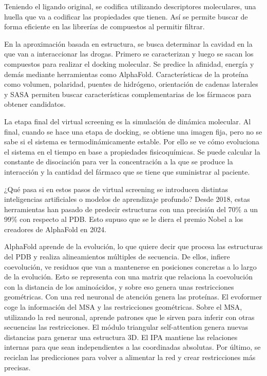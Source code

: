 Teniendo el ligando original, se codifica utilizando descriptores moleculares, una huella que va a codificar las propiedades que tienen. Así se permite buscar de forma eficiente en las librerías de compuestos al permitir filtrar. 

En la aproximación basada en estructura, se busca determinar la cavidad en la que van a interaccionar las drogas. Primero se caracterizan y luego se sacan los compuestos para realizar el docking molecular. Se predice la afinidad, energía y demás mediante herramientas como AlphaFold. Características de la proteína como volumen, polaridad, puentes de hidrógeno, orientación de cadenas laterales y SASA permiten buscar características complementarias de los fármacos para obtener candidatos. 

La etapa final del virtual screening es la simulación de dinámica molecular. Al final, cuando se hace una etapa de docking, se obtiene una imagen fija, pero no se sabe si el sistema es termodinámicamente estable. Por ello se ve cómo evoluciona el sistema en el tiempo en base a propiedades fisicoquímicas. Se puede calcular la constante de disociación para ver la concentración a la que se produce la interacción y la cantidad del fármaco que se tiene que suministrar al paciente. 

¿Qué pasa si en estos pasos de virtual screening se introducen distintas inteligencias artificiales o modelos de aprendizaje profundo? Desde 2018, estas herramientas han pasado de predecir estructuras con una precisión del 70\% a un 99\% con respecto al PDB. Esto supuso que se le diera el premio Nobel a los creadores de AlphaFold en 2024. 

AlphaFold aprende de la evolución, lo que quiere decir que procesa las estructuras del PDB y realiza alineamientos múltiples de secuencia. De ellos, infiere coevolución, ve residuos que van a mantenerse en posiciones concretas a lo largo de la evolución. Esto se representa con una matriz que relaciona la coevolución con la distancia de los aminoácidos, y sobre eso genera unas restricciones geométricas. Con una red neuronal de atención genera las proteínas. El evoformer coge la información del MSA y las restricciones geométricas. Sobre el MSA, utilizando la red neuronal, aprende patrones que le sirven para inferir con otras secuencias las restricciones. El módulo triangular self-attention genera nuevas distancias para generar una estructura 3D. El IPA mantiene las relaciones internas para que sean independientes a las coordinadas absolutas. Por último, se reciclan las predicciones para volver a alimentar la red y crear restricciones más precisas.

